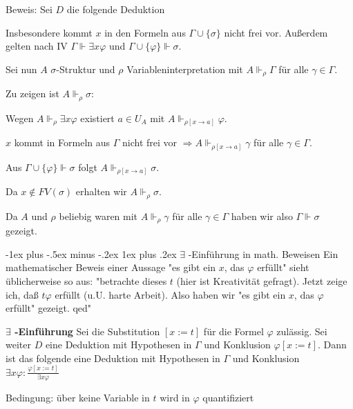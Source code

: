 \documentclass[a4paper]{article}
\makeatletter
\renewcommand{\note}[2]{\begin{noteBox} \textbf{#1} #2 \end{noteBox}}
\renewcommand{\subsubsection}{\@startsection{subsubsection}{3}{0mm}%
                {-1ex plus -.5ex minus -.2ex}%
                {1ex plus .2ex}%
                {\normalfont\small\bfseries}}
\makeatother
\begin{document}
\begin{multicols}{3}
  Beweis: Sei $D$ die folgende Deduktion
  \begin{itemize*}
    \item Insbesondere kommt $x$ in den Formeln aus $\Gamma\cup\{\sigma\}$ nicht frei vor. Außerdem gelten nach IV $\Gamma\Vdash\exists x\varphi$ und $\Gamma\cup\{\varphi\}\Vdash\sigma$.
    \item Sei nun $A$ $\sigma$-Struktur und $\rho$ Variableninterpretation mit $A\Vdash_\rho\Gamma$ für alle $\gamma\in\Gamma$.
    \item Zu zeigen ist $A\Vdash_\rho\sigma$:
    \begin{itemize*}
      \item Wegen $A\Vdash_\rho\exists x\varphi$ existiert $a\in U_A$ mit $A\Vdash_{\rho[x\rightarrow a]}\varphi$.
      \item $x$ kommt in Formeln aus $\Gamma$ nicht frei vor $\Rightarrow A\Vdash_{\rho[x\rightarrow a]}\gamma$ für alle $\gamma\in\Gamma$.
      \item Aus $\Gamma\cup\{\varphi\}\Vdash\sigma$ folgt $A\Vdash_{\rho[x\rightarrow a]}\sigma$.
      \item Da $x\not\in FV(\sigma)$ erhalten wir $A\Vdash_\rho \sigma$.
    \end{itemize*}
    \item Da $A$ und $\rho$ beliebig waren mit $A\Vdash_\rho\gamma$ für alle $\gamma\in\Gamma$ haben wir also $\Gamma\Vdash\sigma$ gezeigt.
  \end{itemize*}

  \subsubsection{$\exists$ -Einführung in math. Beweisen}
  Ein mathematischer Beweis einer Aussage "es gibt ein $x$, das $\varphi$ erfüllt" sieht üblicherweise so aus: "betrachte dieses $t$ (hier ist Kreativität gefragt). Jetzt zeige ich, daß $t\varphi$ erfüllt (u.U. harte Arbeit). Also haben wir "es gibt ein $x$, das $\varphi$ erfüllt" gezeigt. qed"

  \note{$\exists$ -Einführung}{Sei die Substitution $[x:=t]$ für die Formel $\varphi$ zulässig.
    Sei weiter $D$ eine Deduktion mit Hypothesen in $\Gamma$ und Konklusion $\varphi[x:=t]$.
    Dann ist das folgende eine Deduktion mit Hypothesen in $\Gamma$ und Konklusion $\exists x\varphi:\frac{\varphi[x:=t]}{\exists x\varphi}$

    Bedingung: über keine Variable in $t$ wird in $\varphi$ quantifiziert}


\end{multicols}
\end{document}

